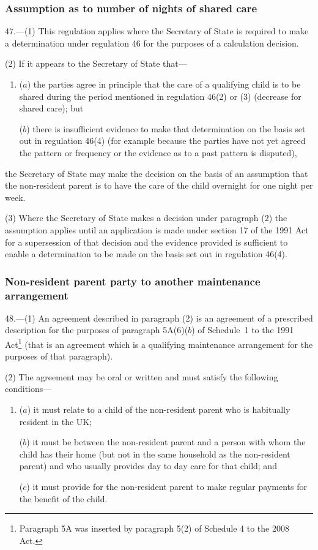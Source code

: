 \documentclass[12pt,a4paper]{article}
\begin{document}
\subsubsection[47. Assumption as to number of nights of shared care]{Assumption as to number of nights of shared care}

47.---(1)  This regulation applies where the Secretary of State is required to make a determination under regulation 46 for the purposes of a calculation decision.

(2) If it appears to the Secretary of State that—
\begin{enumerate}\item[]
($a$) the parties agree in principle that the care of a qualifying child is to be shared during the period mentioned in regulation 46(2) or (3) (decrease for shared care); but

($b$) there is insufficient evidence to make that determination on the basis set out in regulation 46(4) (for example because the parties have not yet agreed the pattern or frequency or the evidence as to a past pattern is disputed),
\end{enumerate}
the Secretary of State may make the decision on the basis of an assumption that the non-resident parent is to have the care of the child overnight for one night per week.

(3) Where the Secretary of State makes a decision under paragraph (2) the assumption applies until an application is made under section 17 of the 1991 Act for a supersession of that decision and the evidence provided is sufficient to enable a determination to be made on the basis set out in regulation 46(4).

\subsubsection[48. Non-resident parent party to another maintenance arrangement]{Non-resident parent party to another maintenance arrangement}

48.---(1)  An agreement described in paragraph (2) is an agreement of a prescribed description for the purposes of paragraph 5A(6)($b$)  of Schedule~1 to the 1991 Act\footnote{Paragraph 5A was inserted by paragraph 5(2) of Schedule 4 to the 2008 Act.} (that is an agreement which is a qualifying maintenance arrangement for the purposes of that paragraph).

(2) The agreement may be oral or written and must satisfy the following conditions—
\begin{enumerate}\item[]
($a$) it must relate to a child of the non-resident parent who is habitually resident in the UK;

($b$) it must be between the non-resident parent and a person with whom the child has their home (but not in the same household as the non-resident parent) and who usually provides day to day care for that child; and

($c$) it must provide for the non-resident parent to make regular payments for the benefit of the child.
\end{enumerate}
\end{document}

